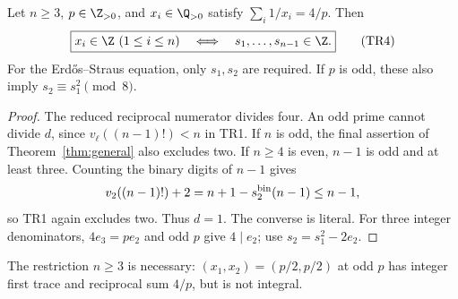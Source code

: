 \begin{corollary}\label{cor:four}
Let $n\ge3$, $p\in\Z_{>0}$, and $x_i\in\Q_{>0}$ satisfy
$\sum_i1/x_i=4/p$. Then
\[
 \boxed{x_i\in\Z\ (1\le i\le n)
 \quad\Longleftrightarrow\quad s_1,\ldots,s_{n-1}\in\Z.} \tag{TR4}
\]
For the Erd\H{o}s--Straus equation, only $s_1,s_2$ are required. If $p$ is odd,
these also imply $s_2\equiv s_1^2\pmod8$.
\end{corollary}
\begin{proof}
The reduced reciprocal numerator divides four. An odd prime cannot divide $d$,
since $v_\ell((n-1)!)<n$ in TR1. If $n$ is odd, the final assertion of
Theorem~\ref{thm:general} also excludes two. If $n\ge4$ is even, $n-1$ is odd
and at least three. Counting the binary digits of $n-1$ gives
\[
 v_2((n-1)!)+2=n+1-s_2^{\rm bin}(n-1)\le n-1,
\]
so TR1 again excludes two. Thus $d=1$. The converse is literal. For three
integer denominators, $4e_3=pe_2$ and odd $p$ give $4\mid e_2$; use
$s_2=s_1^2-2e_2$.
\end{proof}
The restriction $n\ge3$ is necessary: $(x_1,x_2)=(p/2,p/2)$ at odd $p$ has
integer first trace and reciprocal sum $4/p$, but is not integral.

